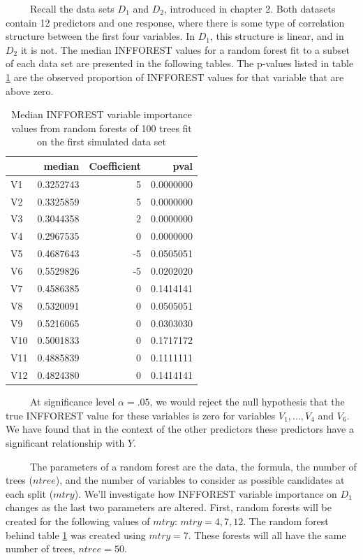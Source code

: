 \documentclass[12pt,twoside]{reedthesis}
\begin{document}
  ~~~~~Recall the data sets \(D_1\) and \(D_2\), introduced in chapter 2.
  Both datasets contain 12 predictors and one response, where there is
  some type of correlation structure between the first four variables. In
  \(D_1\), this structure is linear, and in \(D_2\) it is not. The median
  INFFOREST values for a random forest fit to a subset of each data set
  are presented in the following tables. The p-values listed in table
  \ref{tab:tabviD1} are the observed proportion of INFFOREST values for
  that variable that are above zero.
  
  \begin{table}
  
  \caption{\label{tab:unnamed-chunk-25}\label{tab:tabviD1}Median INFFOREST variable importance values from random forests of 100 trees fit on the first simulated data set}
  \centering
  \begin{tabular}[t]{l|r|r|r}
  \hline
    & median & Coefficient & pval\\
  \hline
  V1 & 0.3252743 & 5 & 0.0000000\\
  \hline
  V2 & 0.3325859 & 5 & 0.0000000\\
  \hline
  V3 & 0.3044358 & 2 & 0.0000000\\
  \hline
  V4 & 0.2967535 & 0 & 0.0000000\\
  \hline
  V5 & 0.4687643 & -5 & 0.0505051\\
  \hline
  V6 & 0.5529826 & -5 & 0.0202020\\
  \hline
  V7 & 0.4586385 & 0 & 0.1414141\\
  \hline
  V8 & 0.5320091 & 0 & 0.0505051\\
  \hline
  V9 & 0.5216065 & 0 & 0.0303030\\
  \hline
  V10 & 0.5001833 & 0 & 0.1717172\\
  \hline
  V11 & 0.4885839 & 0 & 0.1111111\\
  \hline
  V12 & 0.4824380 & 0 & 0.1414141\\
  \hline
  \end{tabular}
  \end{table}
  
  ~~~~~At significance level \(\alpha = .05\), we would reject the null
  hypothesis that the true INFFOREST value for these variables is zero for
  variables \(V_1,...,V_4\) and \(V_6\). We have found that in the context
  of the other predictors these predictors have a significant relationship
  with \(Y\).
  
  ~~~~~The parameters of a random forest are the data, the formula, the
  number of trees (\(ntree\)), and the number of variables to consider as
  possible candidates at each split (\(mtry\)). We'll investigate how
  INFFOREST variable importance on \(D_1\) changes as the last two
  parameters are altered. First, random forests will be created for the
  following values of \(mtry\): \(mtry = 4,7,12\). The random forest
  behind table \ref{tab:tabviD1} was created using \(mtry = 7\). These
  forests will all have the same number of trees, \(ntree = 50\).
  
\end{document}
